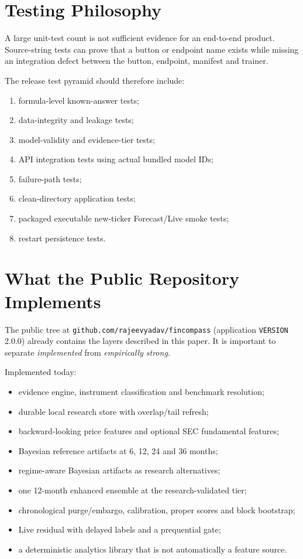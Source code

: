 \documentclass[11pt]{article}
\begin{document}
\section{Testing Philosophy}
A large unit-test count is not sufficient evidence for an end-to-end product. Source-string tests can prove that a button or endpoint name exists while missing an integration defect between the button, endpoint, manifest and trainer.

The release test pyramid should therefore include:
\begin{enumerate}[itemsep=0.2em]
\item formula-level known-answer tests;
\item data-integrity and leakage tests;
\item model-validity and evidence-tier tests;
\item API integration tests using actual bundled model IDs;
\item failure-path tests;
\item clean-directory application tests;
\item packaged executable new-ticker Forecast/Live smoke tests;
\item restart persistence tests.
\end{enumerate}


\section{What the Public Repository Implements}
The public tree at \texttt{github.com/rajeevyadav/fincompass} (application \texttt{VERSION} 2.0.0) already contains the layers described in this paper. It is important to separate \emph{implemented} from \emph{empirically strong}.

Implemented today:
\begin{itemize}[itemsep=0.15em]
\item evidence engine, instrument classification and benchmark resolution;
\item durable local research store with overlap/tail refresh;
\item backward-looking price features and optional SEC fundamental features;
\item Bayesian reference artifacts at 6, 12, 24 and 36 months;
\item regime-aware Bayesian artifacts as research alternatives;
\item one 12-month enhanced ensemble at the research-validated tier;
\item chronological purge/embargo, calibration, proper scores and block bootstrap;
\item Live residual with delayed labels and a prequential gate;
\item a deterministic analytics library that is not automatically a feature source.
\end{itemize}
\end{document}
